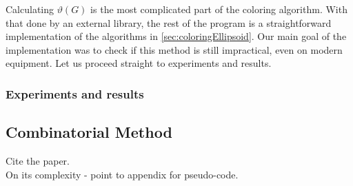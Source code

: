 Calculating $\vartheta(G)$ is the most complicated part of the coloring algorithm. With that done by an external library, the rest of the program is a straightforward implementation of the algorithms in \cref{sec:coloringEllipsoid}. Our main goal of the implementation was to check if this method is still impractical, even on modern equipment. Let us proceed straight to experiments and results.

\subsubsection{Experiments and results}

\subsection{Combinatorial Method}

Cite the paper.\\

On its complexity - point to appendix for pseudo-code.